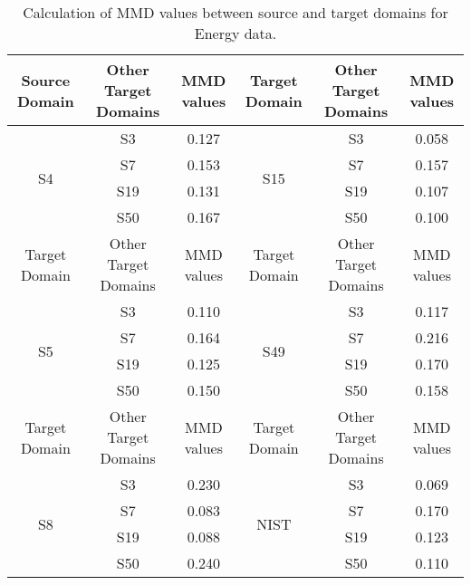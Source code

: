 \documentclass[letterpaper]{article} %
\begin{document}
\begin{table*}[t!]
\caption{Calculation of MMD values between source and target domains for Energy data.}
\centering
\label{tab:mmd}
\begin{tabular}{|c|c|c|c|c|c|}
\hline
Source Domain       & Other Target Domains & MMD values & Target Domain         & Other Target Domains & MMD values \\ \hline
\multirow{4}{*}{S4} & S3                   & 0.127      & \multirow{4}{*}{S15}  & S3                   & 0.058      \\ \cline{2-3} \cline{5-6}
                    & S7                   & 0.153      &                       & S7                   & 0.157      \\ \cline{2-3} \cline{5-6}
                    & S19                  & 0.131      &                       & S19                  & 0.107      \\ \cline{2-3} \cline{5-6}
                    & S50                  & 0.167        &                       & S50                  & 0.100      \\ \hline
Target Domain       & Other Target Domains & MMD values & Target Domain         & Other Target Domains & MMD values \\ \hline
\multirow{4}{*}{S5} & S3                   & 0.110      & \multirow{4}{*}{S49}  & S3                   & 0.117      \\ \cline{2-3} \cline{5-6}
                    & S7                   & 0.164      &                       & S7                   & 0.216      \\ \cline{2-3} \cline{5-6}
                    & S19                  & 0.125      &                       & S19                  & 0.170      \\ \cline{2-3} \cline{5-6}
                    & S50                  & 0.150      &                       & S50                  & 0.158      \\ \hline
Target Domain       & Other Target Domains & MMD values & Target Domain         & Other Target Domains & MMD values \\ \hline
\multirow{4}{*}{S8} & S3                   & 0.230      & \multirow{4}{*}{NIST} & S3                   & 0.069      \\ \cline{2-3} \cline{5-6}
                    & S7                   & 0.083      &                       & S7                   & 0.170      \\ \cline{2-3} \cline{5-6}
                    & S19                  & 0.088      &                       & S19                  & 0.123      \\ \cline{2-3} \cline{5-6}
                    & S50                  & 0.240      &                       & S50                  & 0.110      \\ \hline
\end{tabular}
\end{table*}
\end{document}
